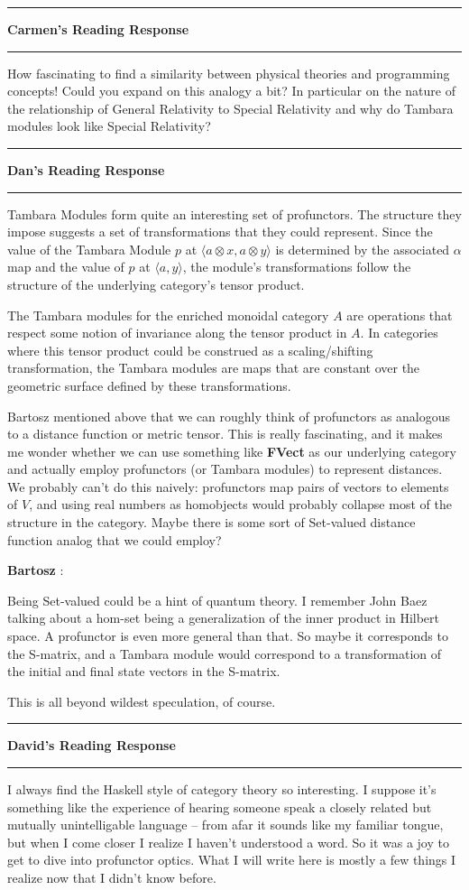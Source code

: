 \documentclass{amsart}
\newcommand{\iam}[1]{
  \vspace{0.25em}
  \hrule
  \vspace{0.25em}
  \textbf{{#1}'s Reading Response}
  \vspace{0.25em}
  \hrule
  \vspace{1em}
}
\newcommand{\respond}[1]{
  \vspace{1em} \textbf{#1}
}
\begin{document}
\iam{Carmen}

How fascinating to find a similarity between physical theories and programming concepts! Could you expand on this analogy a bit? In particular on the nature of the relationship of General Relativity to Special Relativity and why do Tambara modules look like Special Relativity?


\iam{Dan}

Tambara Modules form quite an interesting set of profunctors. The structure they impose suggests a set of transformations that they could represent. Since the value of the Tambara Module $p$ at $\langle a \otimes x, a \otimes y\rangle$ is determined by the associated $\alpha$ map and the value of $p$ at $\langle a,y \rangle$, the module's transformations follow the structure of the underlying category's tensor product.

The Tambara modules for the enriched monoidal category $A$ are operations that respect some notion of invariance along the tensor product in $A$. In categories where this tensor product could be construed as a scaling/shifting transformation, the Tambara modules are maps that are constant over the geometric surface defined by these transformations.

Bartosz mentioned above that we can roughly think of profunctors as analogous to a distance function or metric tensor. This is really fascinating, and it makes me wonder whether we can use something like \textbf{FVect} as our underlying category and actually employ profunctors (or Tambara modules) to represent distances. We probably can't do this naively: profunctors map pairs of vectors to elements of $V$, and using real numbers as homobjects would probably collapse most of the structure in the category. Maybe there is some sort of Set-valued distance function analog that we could employ?

\respond{Bartosz}:

Being Set-valued could be a hint of quantum theory. I remember John Baez talking about a hom-set being a generalization of the inner product in Hilbert space. A profunctor is even more general than that. So maybe it corresponds to the S-matrix, and a Tambara module would correspond to a transformation of the initial and final state vectors in the S-matrix. 

This is all beyond wildest speculation, of course.

\iam{David}
I always find the Haskell style of category theory so interesting. I suppose
it's something like the experience of hearing someone speak a closely related
but mutually unintelligable language -- from afar it sounds like my familiar
tongue, but when I come closer I realize I haven't understood a word. So it was
a joy to get to dive into profunctor optics. What I will write here is mostly a
few things I realize now that I didn't know before.
\end{document}
